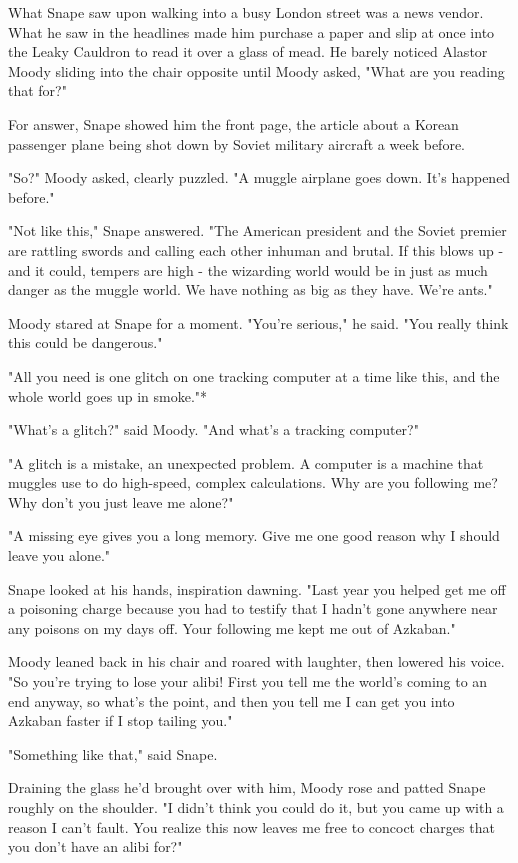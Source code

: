 \documentclass[a4paper,11pt]{article}
\begin{document}
What Snape saw upon walking into a busy London street was a news vendor. What he saw in the headlines made him purchase a paper and slip at once into the Leaky Cauldron to read it over a glass of mead. He barely noticed Alastor Moody sliding into the chair opposite until Moody asked, "What are you reading that for?"

For answer, Snape showed him the front page, the article about a Korean passenger plane being shot down by Soviet military aircraft a week before.

"So?" Moody asked, clearly puzzled. "A muggle airplane goes down. It's happened before."

"Not like this," Snape answered. "The American president and the Soviet premier are rattling swords and calling each other inhuman and brutal. If this blows up - and it could, tempers are high - the wizarding world would be in just as much danger as the muggle world. We have nothing as big as they have. We're ants."

Moody stared at Snape for a moment. "You're serious," he said. "You really think this could be dangerous."

"All you need is one glitch on one tracking computer at a time like this, and the whole world goes up in smoke."*

"What's a glitch?" said Moody. "And what's a tracking computer?"

"A glitch is a mistake, an unexpected problem. A computer is a machine that muggles use to do high-speed, complex calculations. Why are you following me? Why don't you just leave me alone?"

"A missing eye gives you a long memory. Give me one good reason why I should leave you alone."

Snape looked at his hands, inspiration dawning. "Last year you helped get me off a poisoning charge because you had to testify that I hadn't gone anywhere near any poisons on my days off. Your following me kept me out of Azkaban."

Moody leaned back in his chair and roared with laughter, then lowered his voice. "So you're trying to lose your alibi! First you tell me the world's coming to an end anyway, so what's the point, and then you tell me I can get you into Azkaban faster if I stop tailing you."

"Something like that," said Snape.

Draining the glass he'd brought over with him, Moody rose and patted Snape roughly on the shoulder. "I didn't think you could do it, but you came up with a reason I can't fault. You realize this now leaves me free to concoct charges that you don't have an alibi for?"
\end{document}
